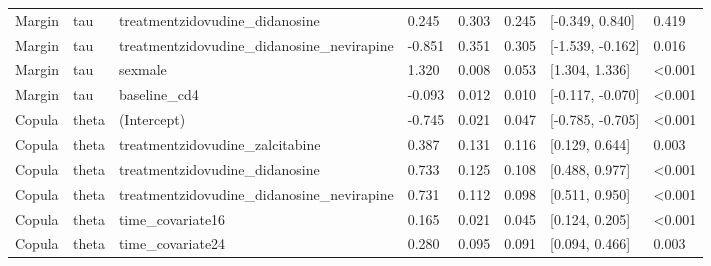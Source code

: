 \begin{table}
\begin{tabular}[t]{llllllll}
Margin & tau & treatmentzidovudine\_didanosine & 0.245 & 0.303 & 0.245 & {}[-0.349, 0.840] & 0.419\\
Margin & tau & treatmentzidovudine\_didanosine\_nevirapine & -0.851 & 0.351 & 0.305 & {}[-1.539, -0.162] & 0.016\\
Margin & tau & sexmale & 1.320 & 0.008 & 0.053 & {}[1.304, 1.336] & <0.001\\
Margin & tau & baseline\_cd4 & -0.093 & 0.012 & 0.010 & {}[-0.117, -0.070] & <0.001\\
\addlinespace
Copula & theta & (Intercept) & -0.745 & 0.021 & 0.047 & {}[-0.785, -0.705] & <0.001\\
Copula & theta & treatmentzidovudine\_zalcitabine & 0.387 & 0.131 & 0.116 & {}[0.129, 0.644] & 0.003\\
Copula & theta & treatmentzidovudine\_didanosine & 0.733 & 0.125 & 0.108 & {}[0.488, 0.977] & <0.001\\
Copula & theta & treatmentzidovudine\_didanosine\_nevirapine & 0.731 & 0.112 & 0.098 & {}[0.511, 0.950] & <0.001\\
Copula & theta & time\_covariate16 & 0.165 & 0.021 & 0.045 & {}[0.124, 0.205] & <0.001\\
\addlinespace
Copula & theta & time\_covariate24 & 0.280 & 0.095 & 0.091 & {}[0.094, 0.466] & 0.003\\
\bottomrule
\end{tabular}
\end{table}
